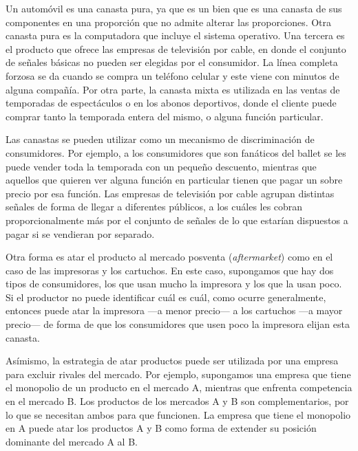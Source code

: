 \documentclass[
  12pt,
  spanish,
]{book}
\begin{document}
Un automóvil es una canasta pura, ya que es un bien que es una canasta
de sus componentes en una proporción que no admite alterar las
proporciones. Otra canasta pura es la computadora que incluye el sistema
operativo. Una tercera es el producto que ofrece las empresas de
televisión por cable, en donde el conjunto de señales básicas no pueden
ser elegidas por el consumidor. La línea completa forzosa se da cuando
se compra un teléfono celular y este viene con minutos de alguna
compañía. Por otra parte, la canasta mixta es utilizada en las ventas de
temporadas de espectáculos o en los abonos deportivos, donde el cliente
puede comprar tanto la temporada entera del mismo, o alguna función
particular.

Las canastas se pueden utilizar como un mecanismo de discriminación de
consumidores. Por ejemplo, a los consumidores que son fanáticos del
ballet se les puede vender toda la temporada con un pequeño descuento,
mientras que aquellos que quieren ver alguna función en particular
tienen que pagar un sobre precio por esa función. Las empresas de
televisión por cable agrupan distintas señales de forma de llegar a
diferentes públicos, a los cuáles les cobran proporcionalmente más por
el conjunto de señales de lo que estarían dispuestos a pagar si se
vendieran por separado.

Otra forma es atar el producto al mercado posventa (\emph{aftermarket})
como en el caso de las impresoras y los cartuchos. En este caso,
supongamos que hay dos tipos de consumidores, los que usan mucho la
impresora y los que la usan poco. Si el productor no puede identificar
cuál es cuál, como ocurre generalmente, entonces puede atar la impresora
---a menor precio--- a los cartuchos ---a mayor precio--- de forma de
que los consumidores que usen poco la impresora elijan esta canasta.

Asímismo, la estrategia de atar productos puede ser utilizada por una
empresa para excluir rivales del mercado. Por ejemplo, supongamos una
empresa que tiene el monopolio de un producto en el mercado A, mientras
que enfrenta competencia en el mercado B. Los productos de los mercados
A y B son complementarios, por lo que se necesitan ambos para que
funcionen. La empresa que tiene el monopolio en A puede atar los
productos A y B como forma de extender su posición dominante del mercado
A al B.
\end{document}
